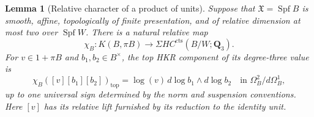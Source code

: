\documentclass[11pt,a4paper]{article}
\newtheorem{lemma}[theorem]{Lemma}
\theoremstyle{remark}
\begin{document}
\begin{lemma}[Relative character of a product of units]
\label{lem:relativelogproduct}
Suppose that $\mathfrak X=\operatorname{Spf}B$ is smooth, affine,
topologically of finite presentation, and of relative dimension at
most two over $\operatorname{Spf}W$. There is a natural relative map
\[
 \chi_B:K(B,\pi B)\longrightarrow
                  \Sigma HC^{\mathrm{cts}}(B/W;\mathbf Q_3).
\]
For $v\in1+\pi B$ and $b_1,b_2\in B^\times$, the top HKR component
of its degree-three value is
\begin{equation}\label{eq:tcreviewlogproduct}
 \chi_B([v][b_1][b_2])_{\mathrm{top}}
   =\log(v)\,d\log b_1\wedge d\log b_2
       \quad\text{in }\Omega_B^2/d\Omega_B^1,
\end{equation}
up to one universal sign determined by the norm and suspension
conventions. Here $[v]$ has its relative lift furnished by its reduction
to the identity unit.
\end{lemma}
\end{document}

